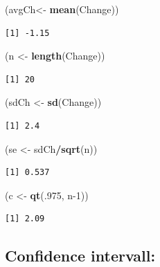 \documentclass[]{book}
\newenvironment{Shaded}{\begin{snugshade}}{\end{snugshade}}
\newcommand{\DecValTok}[1]{\textcolor[rgb]{0.00,0.00,0.81}{#1}}
\newcommand{\KeywordTok}[1]{\textcolor[rgb]{0.13,0.29,0.53}{\textbf{#1}}}
\newcommand{\NormalTok}[1]{#1}
\newcommand{\OperatorTok}[1]{\textcolor[rgb]{0.81,0.36,0.00}{\textbf{#1}}}
\newcommand{\StringTok}[1]{\textcolor[rgb]{0.31,0.60,0.02}{#1}}
\theoremstyle{definition}
\theoremstyle{definition}
\theoremstyle{definition}
\theoremstyle{remark}
\begin{document}
\begin{Shaded}
\begin{Highlighting}[]
\NormalTok{(avgCh<-}\StringTok{ }\KeywordTok{mean}\NormalTok{(Change))}
\end{Highlighting}
\end{Shaded}

\begin{verbatim}
[1] -1.15
\end{verbatim}

\begin{Shaded}
\begin{Highlighting}[]
\NormalTok{(n    <-}\StringTok{ }\KeywordTok{length}\NormalTok{(Change))}
\end{Highlighting}
\end{Shaded}

\begin{verbatim}
[1] 20
\end{verbatim}

\begin{Shaded}
\begin{Highlighting}[]
\NormalTok{(sdCh <-}\StringTok{ }\KeywordTok{sd}\NormalTok{(Change))}
\end{Highlighting}
\end{Shaded}

\begin{verbatim}
[1] 2.4
\end{verbatim}

\begin{Shaded}
\begin{Highlighting}[]
\NormalTok{(se   <-}\StringTok{ }\NormalTok{sdCh}\OperatorTok{/}\KeywordTok{sqrt}\NormalTok{(n))}
\end{Highlighting}
\end{Shaded}

\begin{verbatim}
[1] 0.537
\end{verbatim}

\begin{Shaded}
\begin{Highlighting}[]
\NormalTok{(c    <-}\StringTok{ }\KeywordTok{qt}\NormalTok{(.}\DecValTok{975}\NormalTok{, n}\DecValTok{-1}\NormalTok{))}
\end{Highlighting}
\end{Shaded}

\begin{verbatim}
[1] 2.09
\end{verbatim}

\hypertarget{confidence-intervall}{%
\subsection{Confidence intervall:}\label{confidence-intervall}}
\end{document}
